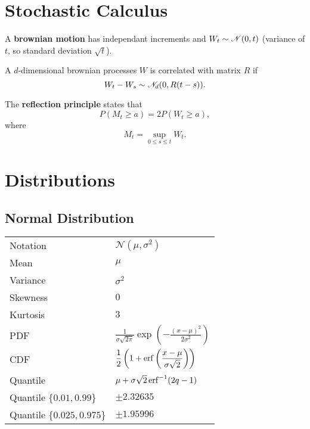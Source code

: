 \section{Stochastic Calculus}

\begin{outline}
  \1 A \textbf{brownian motion} has independant increments and $W_t \sim \mathscr{N}(0,t)$
  (variance of $t$, so standard deviation $\sqrt{t}$).

  \1 A $d$-dimensional brownian processes $W$ is correlated with matrix $R$ if
  \begin{equation*}
    W_t - W_s \sim \mathscr{N}_d(0, R(t-s)).
  \end{equation*}


  \1 The \textbf{reflection principle} states that 
  \begin{equation*}
    P(M_t \geq a) = 2P(W_t \geq a),
  \end{equation*}
  where 
  \begin{equation*}
    M_t = \sup_{0\leq s \leq t} W_t.
  \end{equation*}
\end{outline}

\section{Distributions}

\subsection{Normal Distribution}

\begin{center}
\begin{tabular}{ll} \toprule
  Notation & $\mathscr{N}(\mu,\sigma^2)$\\
  Mean & $\mu$\\
  Variance & $\sigma^2$\\
  Skewness & $0$\\
  Kurtosis & $3$\\
  PDF & $\displaystyle
        \frac{1}{\sigma\sqrt{2\pi}}\exp\left(-\frac{(x-\mu)^2}{2\sigma^2}\right)$\\
  CDF & $\displaystyle
        \frac{1}{2}\left(1+\operatorname{erf}\left(\frac{x-\mu}{\sigma\sqrt{2}}\right)\right)$\\
  Quantile & $\mu + \sigma\sqrt{2}\operatorname{erf}^{-1}(2q-1)$\\
  Quantile $\{0.01,0.99\}$ & $\pm 2.32635$\\
  Quantile $\{0.025,0.975\}$ & $\pm 1.95996$\\
  \bottomrule
\end{tabular}
\end{center}

